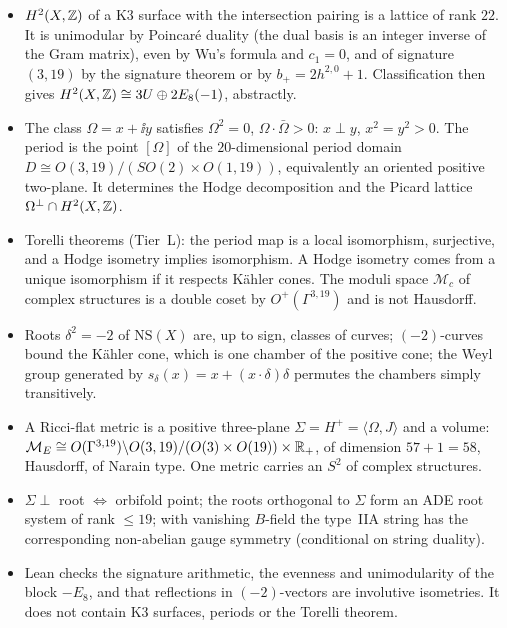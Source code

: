 \begin{summarybox}
\begin{itemize}[leftmargin=*,itemsep=1pt]
\item $H^2(X,\mathbb{Z})$ of a K3 surface with the intersection pairing is a lattice of rank $22$. It
 is unimodular by Poincaré duality (the dual basis is an integer inverse of the Gram matrix),
 even by Wu's formula and $c_1=0$, and of signature $(3,19)$ by the signature theorem or by
 $b_+=2h^{2,0}+1$. Classification then gives $H^2(X,\mathbb{Z})\cong3U\oplus2E_8(-1)$, abstractly.
\item The class $\Omega=x+\ii y$ satisfies $\Omega^2=0$, $\Omega\cdot\bar\Omega>0$:
 $x\perp y$, $x^2=y^2>0$. The period is the point $[\Omega]$ of the $20$-dimensional period
 domain $D\cong O(3,19)/(SO(2)\times O(1,19))$, equivalently an oriented positive two-plane.
 It determines the Hodge decomposition and the Picard lattice $\Omega^\perp\cap H^2(X,\mathbb{Z})$.
\item Torelli theorems (Tier~L): the period map is a local isomorphism, surjective, and a
 Hodge isometry implies isomorphism. A Hodge isometry comes from a unique isomorphism if it
 respects Kähler cones. The moduli space $\mathcal M_c$ of complex structures is a double
 coset by $O^+(\Gamma^{3,19})$ and is not Hausdorff.
\item Roots $\delta^2=-2$ of $\mathrm{NS}(X)$ are, up to sign, classes of curves; $(-2)$-curves
 bound the Kähler cone, which is one chamber of the positive cone; the Weyl group generated
 by $s_\delta(x)=x+(x\cdot\delta)\delta$ permutes the chambers simply transitively.
\item A Ricci-flat metric is a positive three-plane $\Sigma=H^+=\langle\Omega,J\rangle$ and a
 volume: $\mathcal M_E\cong O(\Gamma^{3,19})\backslash O(3,19)/(O(3)\times O(19))\times\mathbb{R}_+$, of
 dimension $57+1=58$, Hausdorff, of Narain type. One metric carries an $S^2$ of complex
 structures.
\item $\Sigma\perp$ root $\Leftrightarrow$ orbifold point; the roots orthogonal to $\Sigma$
 form an ADE root system of rank $\le19$; with vanishing $B$-field the type~IIA string has
 the corresponding non-abelian gauge symmetry (conditional on string duality).
\item Lean checks the signature arithmetic, the evenness and unimodularity of the block
 $-E_8$, and that reflections in $(-2)$-vectors are involutive isometries. It does not
 contain K3 surfaces, periods or the Torelli theorem.
\end{itemize}
\end{summarybox}

